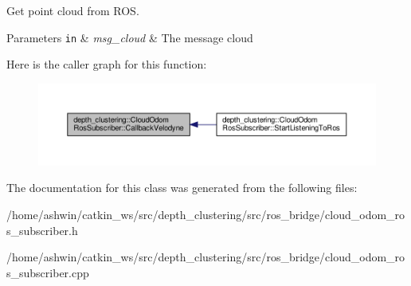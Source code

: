 Get point cloud from R\+OS. 


\begin{DoxyParams}[1]{Parameters}
\mbox{\tt in}  & {\em msg\+\_\+cloud} & The message cloud \\
\hline
\end{DoxyParams}
Here is the caller graph for this function\+:\nopagebreak
\begin{figure}[H]
\begin{center}
\leavevmode
\includegraphics[width=350pt]{classdepth__clustering_1_1CloudOdomRosSubscriber_a8de806bc0b847229dcc92c504908f019_icgraph}
\end{center}
\end{figure}


The documentation for this class was generated from the following files\+:\begin{DoxyCompactItemize}
\item 
/home/ashwin/catkin\+\_\+ws/src/depth\+\_\+clustering/src/ros\+\_\+bridge/cloud\+\_\+odom\+\_\+ros\+\_\+subscriber.\+h\item 
/home/ashwin/catkin\+\_\+ws/src/depth\+\_\+clustering/src/ros\+\_\+bridge/cloud\+\_\+odom\+\_\+ros\+\_\+subscriber.\+cpp\end{DoxyCompactItemize}
